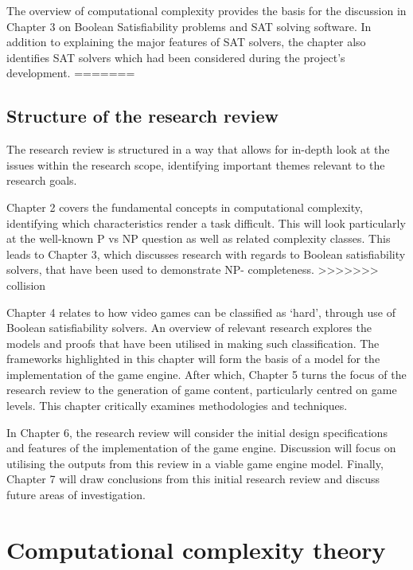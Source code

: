 \documentclass[11pt, a4paper, oneside]{report} %
\begin{document}
The overview of computational complexity provides the basis for the discussion
in Chapter 3 on Boolean Satisfiability problems and SAT solving software. In
addition to explaining the major features of SAT solvers, the chapter also
identifies SAT solvers which had been considered during the project's
development.
=======
\section{Structure of the research review}

The research review is structured in a way that allows for in-depth look at the
issues within the research scope, identifying important themes relevant to the
research goals.

Chapter 2 covers the fundamental concepts in computational complexity,
identifying which characteristics render a task difficult. This will look
particularly at the well-known P vs NP question as well as related complexity
classes. This leads to Chapter 3, which discusses research with regards to
Boolean satisfiability solvers, that have been used to demonstrate NP-
completeness.
>>>>>>> collision

Chapter 4 relates to how video games can be classified as `hard', through use of
Boolean satisfiability solvers. An overview of relevant research explores the
models and proofs that have been utilised in making such classification. The
frameworks highlighted in this chapter will form the basis of a model for the
implementation of the game engine. After which, Chapter 5 turns the focus of the
research review to the generation of game content, particularly centred on game
levels.  This chapter critically examines methodologies and techniques.

In Chapter 6, the research review will consider the initial design
specifications and features of the implementation of the game engine. Discussion
will focus on utilising the outputs from this review in a viable game engine
model. Finally, Chapter 7 will draw conclusions from this initial research
review and discuss future areas of investigation.


\chapter{Computational complexity theory}
\end{document}
